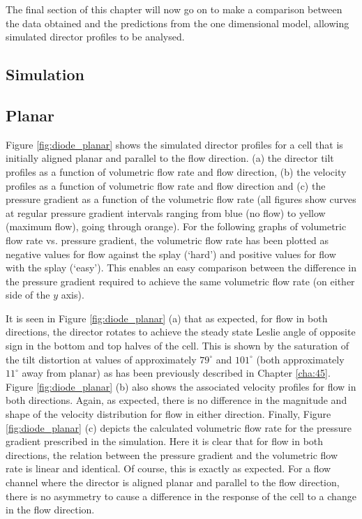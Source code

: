 The final section of this chapter will now go on to make a comparison between the data obtained and the predictions from the one dimensional model, allowing simulated director profiles to be analysed.

\subsection{Simulation}
\subsection{Planar}
Figure \ref{fig:diode_planar} shows the simulated director profiles for a cell that is initially aligned planar and parallel to the flow direction. (a) the director tilt profiles as a function of volumetric flow rate and flow direction, (b) the velocity profiles as a function of volumetric flow rate and flow direction and (c) the pressure gradient as a function of the volumetric flow rate (all figures show curves at regular pressure gradient intervals ranging from blue (no flow) to yellow (maximum flow), going through orange). For the following graphs of volumetric flow rate vs. pressure gradient, the volumetric flow rate has been plotted as negative values for flow against the splay (`hard') and positive values for flow with the splay (`easy'). This enables an easy comparison between the difference in the pressure gradient required to achieve the same volumetric flow rate (on either side of the $y$ axis).

It is seen in Figure \ref{fig:diode_planar} (a) that as expected, for flow in both directions, the director rotates to achieve the steady state Leslie angle of opposite sign in the bottom and top halves of the cell. This is shown by the saturation of the tilt distortion at values of approximately $79^{\circ}$ and $101^{\circ}$ (both approximately $11^{\circ}$ away from planar) as has been previously described in Chapter \ref{cha:45}. Figure \ref{fig:diode_planar} (b) also shows the associated velocity profiles for flow in both directions. Again, as expected, there is no difference in the magnitude and shape of the velocity distribution for flow in either direction. Finally, Figure \ref{fig:diode_planar} (c) depicts the calculated volumetric flow rate for the pressure gradient prescribed in the simulation. Here it is clear that for flow in both directions, the relation between the pressure gradient and the volumetric flow rate is linear and identical. Of course, this is exactly as expected. For a flow channel where the director is aligned planar and parallel to the flow direction, there is no asymmetry to cause a difference in the response of the cell to a change in the flow direction.


